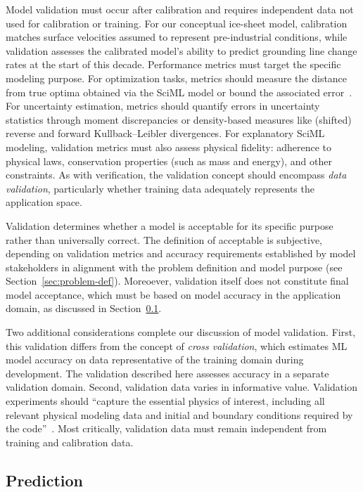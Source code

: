 Model validation must occur after calibration and requires independent data not used for calibration or training. For our conceptual ice-sheet model, calibration matches surface velocities assumed to represent pre-industrial conditions, while validation assesses the calibrated model's ability to predict grounding line change rates at the start of this decade. Performance metrics must target the specific modeling purpose. For optimization tasks, metrics should measure the distance from true optima obtained via the SciML model or bound the associated error~\cite{cao2024lazy}. For uncertainty estimation, metrics should quantify errors in uncertainty statistics through moment discrepancies or density-based measures like (shifted) reverse and forward Kullback--Leibler divergences.
For explanatory SciML modeling, validation metrics must also assess physical fidelity: adherence to physical laws, conservation properties (such as mass and energy), and other constraints. As with verification, the validation concept should encompass \emph{data validation}, particularly whether training data adequately represents the application space.

Validation determines whether a model is acceptable for its specific purpose rather than universally correct. The definition of acceptable is subjective, depending on validation metrics and accuracy requirements established by model stakeholders in alignment with the problem definition and model purpose (see Section~\ref{sec:problem-def}). Moreoever, validation itself does not constitute final model acceptance, which must be based on model accuracy in the application domain, as discussed in Section~\ref{sec:prediction}.

Two additional considerations complete our discussion of model validation. First, this validation differs from the concept of \emph{cross validation}, which estimates ML model accuracy on data representative of the training domain during development. The validation described here assesses accuracy in a separate validation domain. Second, validation data varies in informative value. Validation experiments should ``capture the essential physics of interest, including all relevant physical modeling data and initial and boundary conditions required by the code''~\cite{Oberkampf_T_NED_2008}. Most critically, validation data must remain independent from training and calibration data. 

\subsection{Prediction}
\label{sec:prediction}

